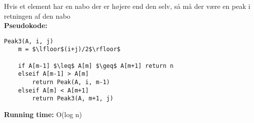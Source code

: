 Hvis et element har en nabo der er højere end den selv, så må der være en peak i retningen af den nabo\\
\textbf{Pseudokode:}
\begin{lstlisting}[frame=single, mathescape=true]
Peak3(A, i, j)
	m = $\lfloor$(i+j)/2$\rfloor$

	if A[m-1] $\leq$ A[m] $\geq$ A[m+1] return n
	elseif A[m-1] > A[m]
		return Peak(A, i, m-1)
	elseif A[m] < A[m+1]
		return Peak3(A, m+1, j)
\end{lstlisting}
\textbf{Running time:} O(log n)
